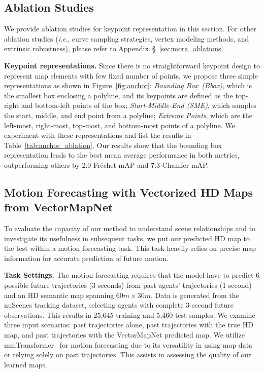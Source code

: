 \documentclass{article}
\newcommand{\ie}{\textit{i}.\textit{e}., }
\theoremstyle{plain}
\theoremstyle{definition}
\theoremstyle{remark}
\begin{document}
\subsection{Ablation Studies}
\label{subsec:ablation}
We provide ablation studies for keypoint representation in this section. For other ablation studies (\ie curve sampling strategies, vertex modeling methods, and extrinsic robustness), please refer to Appendix~\S~\ref{sec:more_ablations}.

\noindent\textbf{Keypoint representations.}
\label{subsec:anchor}
Since there is no straightforward keypoint design to represent map elements with few fixed number of points, we propose three simple representations as shown in Figure~\ref{fig:anchor}: \textit{Bounding Box~(Bbox)}, which is the smallest box enclosing a polyline, and its keypoints are defined as the top-right and bottom-left points of the box; \textit{Start-Middle-End (SME)}, which samples the start, middle, and end point from a polyline; \textit{Extreme Points}, which are the left-most, right-most, top-most, and bottom-most points of a polyline. 
We experiment with these representations and list the results in Table~\ref{tab:anchor_ablation}.
Our results show that the bounding box representation leads to the best mean average performance in both metrics, outperforming others by 2.0 Fr\'echet mAP and 7.3 Chamfer mAP. 


\subsection{Motion Forecasting with Vectorized HD Maps from VectorMapNet}
To evaluate the capacity of our method to understand scene relationships and to investigate its usefulness in subsequent tasks, we put our predicted HD map to the test within a motion forecasting task. This task heavily relies on precise map information for accurate prediction of future motion.

\noindent\textbf{Task Settings.} The motion forecasting requires that the model have to predict 6 possible future trajectories (3 seconds) from past agents' trajectories (1 second) and an HD semantic map spanning $60m\times30m$. Data is generated from the nuScenes tracking dataset, selecting agents with complete 3-second future observations. This results in 25,645 training and 5,460 test samples. We examine three input scenarios: past trajectories alone, past trajectories with the true HD map, and past trajectories with the VectorMapNet predicted map. We utilize mmTransformer~\citep{liu2021multimodal} for motion forecasting due to its versatility in using map data or relying solely on past trajectories. This assists in assessing the quality of our learned maps.
\end{document}
